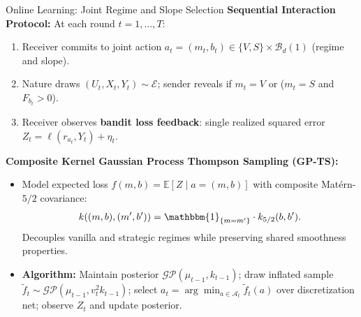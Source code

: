 \documentclass[aspectratio=169, 11pt, t, xcolor=table]{beamer}
\newcommand{\E}{\mathbb{E}}
\newcommand{\env}{\mathcal{E}}
\begin{document}
\begin{frame}{Online Learning: Joint Regime and Slope Selection}
\small
\textbf{Sequential Interaction Protocol:} At each round $t = 1, \dots, T$:
\begin{enumerate}\itemsep=2pt
  \item Receiver commits to joint action $a_t = (m_t, b_t) \in \{V, S\} \times \mathcal{B}_d(1)$ (regime and slope).
  \item Nature draws $(U_t, X_t, Y_t) \sim \env$; sender reveals if $m_t = V$ or ($m_t = S$ and $F_{b_t} > 0$).
  \item Receiver observes \textbf{bandit loss feedback}: single realized squared error $Z_t = \ell(r_{a_t}, Y_t) + \eta_t$.
\end{enumerate}

\vspace{0.4em}
\textbf{Composite Kernel Gaussian Process Thompson Sampling (GP-TS):}
\begin{itemize}\itemsep=2pt
  \item Model expected loss $f(m,b) = \E[Z \mid a=(m,b)]$ with composite Mat\'ern-$5/2$ covariance:
  \[
    k((m,b), (m',b')) = \mathbbm{1}_{\{m=m'\}} \cdot k_{5/2}(b, b').
  \]
  Decouples vanilla and strategic regimes while preserving shared smoothness properties.
  \item \textbf{Algorithm:} Maintain posterior $\mathcal{GP}(\mu_{t-1}, k_{t-1})$; draw inflated sample $\widetilde{f}_t \sim \mathcal{GP}(\mu_{t-1}, v_t^2 k_{t-1})$; select $a_t = \arg\min_{a \in \mathcal{A}_t} \widetilde{f}_t(a)$ over discretization net; observe $Z_t$ and update posterior.
\end{itemize}
\end{frame}
\end{document}

